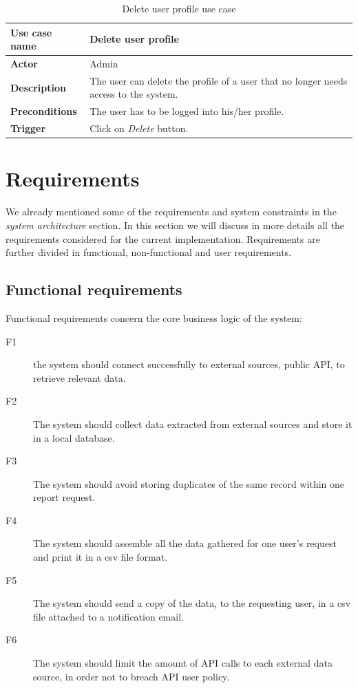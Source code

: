 \begin{table}[H]
\centering
\begin{tabular}{l p{9cm}}  
\toprule
\bf{Use case name}    & Delete user profile \\
\midrule
\bf{Actor}    & Admin \\
\midrule
\bf{Description}    & The user can delete the profile of a user that no longer
needs access to the system.
\\
\midrule
\bf{Preconditions}    & The user has to be logged into his/her profile.
\\
\midrule
\bf{Trigger}    & Click on \emph{Delete} button. \\
\bottomrule
\end{tabular}
\caption{Delete user profile use case}
\end{table}

\section{Requirements}
We already mentioned some of the requirements and system constraints in the
\emph{system architecture} section. In this section we will discuss in more
details all the requirements considered for the current implementation.
Requirements are further divided in functional, non-functional and user
requirements.

\subsection{Functional requirements}
Functional requirements concern the core business logic of the system:
\begin{description}
\item[F1] the system should connect successfully to external sources, public
API, to retrieve relevant data.
\item[F2] The system should collect data extracted from external sources and
store it in a local database.
\item[F3] The system should avoid storing duplicates of the same record within
one report request.
\item[F4] The system should assemble all the data gathered for one user's
request and print it in a csv file format.
\item[F5] The system should send a copy of the data, to the requesting user, in
a csv file attached to a notification email.
\item[F6] The system should limit the amount of API calls to each external data
source, in order not to breach API user policy.
\end{description}

